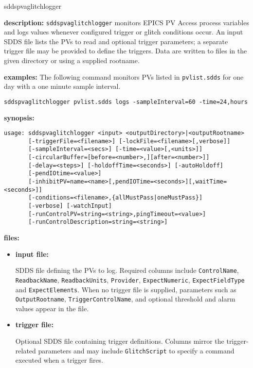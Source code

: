 \begin{sddsprog}{sddspvaglitchlogger}
\item \textbf{description:}
\verb+sddspvaglitchlogger+ monitors EPICS PV Access process variables and
logs values whenever configured trigger or glitch conditions occur.  An input
SDDS file lists the PVs to read and optional trigger parameters; a separate
trigger file may be provided to define the triggers.  Data are written to
files in the given directory or using a supplied rootname.

\item \textbf{examples:}
The following command monitors PVs listed in \verb+pvlist.sdds+ for one day
with a one minute sample interval.
\begin{verbatim}
sddspvaglitchlogger pvlist.sdds logs -sampleInterval=60 -time=24,hours
\end{verbatim}

\item \textbf{synopsis:}
\begin{verbatim}
usage: sddspvaglitchlogger <input> <outputDirectory>|<outputRootname>
       [-triggerFile=<filename>] [-lockFile=<filename>[,verbose]]
       [-sampleInterval=<secs>] [-time=<value>[,<units>]]
       [-circularBuffer=[before=<number>,][after=<number>]]
       [-delay=<steps>] [-holdoffTime=<seconds>] [-autoHoldoff]
       [-pendIOtime=<value>]
       [-inhibitPV=name=<name>[,pendIOTime=<seconds>][,waitTime=<seconds>]]
       [-conditions=<filename>,{allMustPass|oneMustPass}]
       [-verbose] [-watchInput]
       [-runControlPV=string=<string>,pingTimeout=<value>]
       [-runControlDescription=string=<string>]
\end{verbatim}

\item \textbf{files:}
\begin{itemize}
  \item \textbf{input file:}\par
    SDDS file defining the PVs to log. Required columns include
    {\tt ControlName}, {\tt ReadbackName}, {\tt ReadbackUnits},
    {\tt Provider}, {\tt ExpectNumeric}, {\tt ExpectFieldType} and
    {\tt ExpectElements}. When no trigger file is supplied, parameters such as
    {\tt OutputRootname}, {\tt TriggerControlName}, and optional threshold and
    alarm values appear in the file.
  \item \textbf{trigger file:}\par
    Optional SDDS file containing trigger definitions. Columns mirror the
    trigger-related parameters and may include {\tt GlitchScript} to specify a
    command executed when a trigger fires.
\end{itemize}


\end{sddsprog}
